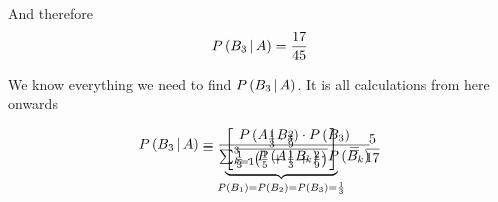 \documentclass[14pt,fleqn]{extarticle}
\newcommand\prob[1]{P \left(#1 \right)}
\begin{document}
\begin{question}
\begin{step}
\begin{options}
            And therefore 
       \[ P\left(B_3\,\vert\,A\right) = \frac{17}{45} \]
        
    \end{options} 
     \reason 
       
     We know everything we need to find $P\left(B_3\,\vert\,A\right)$. It is all 
     calculations from here onwards
     
     \begin{align}
	\condp{B_3}{A} &= \dfrac{\condp{A}{B_3}\cdot \prob{B_3}}{\sum_{k=1}^3 \condp{A}{B_k}\cdot \prob{B_k}} \\[-30pt]
	&= \underbrace{\left[\dfrac{\frac{1}{3}\cdot \frac{2}{9}}{\frac{1}{3}\cdot \left(\frac{1}{5}+\frac{1}{3}+\frac{2}{9} \right)} \right]}_{\prob{B_1}=\prob{B_2} = \prob{B_3} = \frac{1}{3}} = \frac{5}{17}
\end{align}  
\end{step}

\end{question} 
\end{document}
